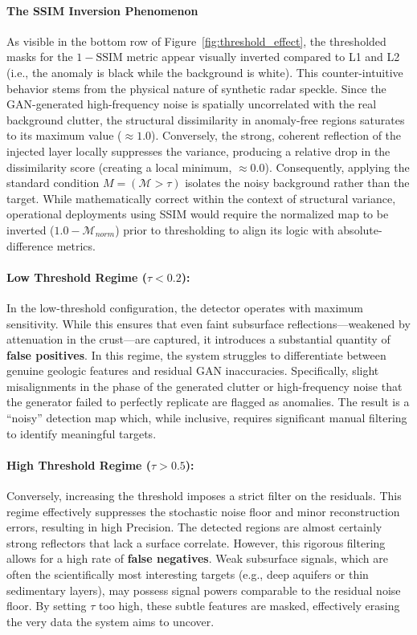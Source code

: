 \paragraph{The SSIM Inversion Phenomenon}
As visible in the bottom row of Figure~\ref{fig:threshold_effect}, the thresholded masks for the $1-\text{SSIM}$ metric appear visually inverted compared to L1 and L2 (i.e., the anomaly is black while the background is white).
This counter-intuitive behavior stems from the physical nature of synthetic radar speckle.
Since the GAN-generated high-frequency noise is spatially uncorrelated with the real background clutter, the structural dissimilarity in anomaly-free regions saturates to its maximum value ($\approx 1.0$).
Conversely, the strong, coherent reflection of the injected layer locally suppresses the variance, producing a relative drop in the dissimilarity score (creating a local minimum, $\approx 0.0$).
Consequently, applying the standard condition $M = (\mathcal{M} > \tau)$ isolates the noisy background rather than the target.
While mathematically correct within the context of structural variance, operational deployments using SSIM would require the normalized map to be inverted ($1.0 - \mathcal{M}_{norm}$) prior to thresholding to align its logic with absolute-difference metrics.

\paragraph{Low Threshold Regime ($\tau < 0.2$):}
In the low-threshold configuration, the detector operates with maximum sensitivity.
While this ensures that even faint subsurface reflections---weakened by attenuation in the crust---are captured, it introduces a substantial quantity of \textbf{false positives}.
In this regime, the system struggles to differentiate between genuine geologic features and residual GAN inaccuracies.
Specifically, slight misalignments in the phase of the generated clutter or high-frequency noise that the generator failed to perfectly replicate are flagged as anomalies.
The result is a \enquote{noisy} detection map which, while inclusive, requires significant manual filtering to identify meaningful targets.

\paragraph{High Threshold Regime ($\tau > 0.5$):}
Conversely, increasing the threshold imposes a strict filter on the residuals.
This regime effectively suppresses the stochastic noise floor and minor reconstruction errors, resulting in high Precision.
The detected regions are almost certainly strong reflectors that lack a surface correlate.
However, this rigorous filtering allows for a high rate of \textbf{false negatives}.
Weak subsurface signals, which are often the scientifically most interesting targets (e.g., deep aquifers or thin sedimentary layers), may possess signal powers comparable to the residual noise floor.
By setting $\tau$ too high, these subtle features are masked, effectively erasing the very data the system aims to uncover.

